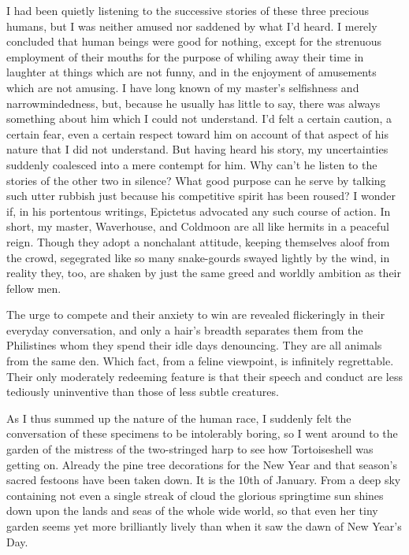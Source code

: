 \documentclass{book}
\begin{document}
I had been quietly listening to the successive stories of these three
precious humans, but I was neither amused nor saddened by what I'd
heard. I merely concluded that human beings were good for nothing,
except for the strenuous employment of their mouths for the purpose of
whiling away their time in laughter at things which are not funny, and
in the enjoyment of amusements which are not amusing. I have long known
of my master's selfishness and narrowmindedness, but, because he usually
has little to say, there was always something about him which I could
not understand. I'd felt a certain caution, a certain fear, even a
certain respect toward him on account of that aspect of his nature that
I did not understand. But having heard his story, my uncertainties
suddenly coalesced into a mere contempt for him. Why can't he listen to
the stories of the other two in silence? What good purpose can he serve
by talking such utter rubbish just because his competitive spirit has
been roused? I wonder if, in his portentous writings, Epictetus
advocated any such course of action. In short, my master, Waverhouse,
and Coldmoon are all like hermits in a peaceful reign. Though they adopt
a nonchalant attitude, keeping themselves aloof from the crowd,
segegrated like so many snake-gourds swayed lightly by the wind, in
reality they, too, are shaken by just the same greed and worldly
ambition as their fellow men.

The urge to compete and their anxiety to win are revealed flickeringly
in their everyday conversation, and only a hair's breadth separates them
from the Philistines whom they spend their idle days denouncing. They
are all animals from the same den. Which fact, from a feline viewpoint,
is infinitely regrettable. Their only moderately redeeming feature is
that their speech and conduct are less tediously uninventive than those
of less subtle creatures.

As I thus summed up the nature of the human race, I suddenly felt the
conversation of these specimens to be intolerably boring, so I went
around to the garden of the mistress of the two-stringed harp to see how
Tortoiseshell was getting on. Already the pine tree decorations for the
New Year and that season's sacred festoons have been taken down. It is
the 10th of January. From a deep sky containing not even a single streak
of cloud the glorious springtime sun shines down upon the lands and seas
of the whole wide world, so that even her tiny garden seems yet more
brilliantly lively than when it saw the dawn of New Year's Day.
\end{document}
